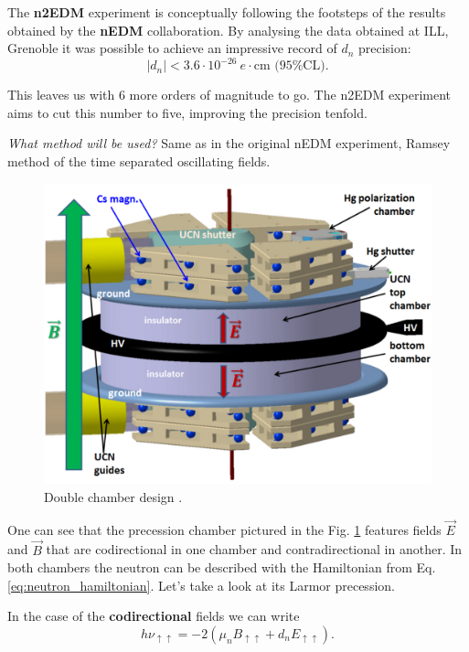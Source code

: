 The \textbf{n2EDM} experiment is conceptually following the footsteps of the results obtained by the \textbf{nEDM} collaboration. By analysing the data obtained at ILL, Grenoble it was possible to achieve \cite{Pendlebury2015} an impressive record of $d_n$ precision:
\begin{equation}
	\left| d_n \right| < 3.6 \cdot 10^{-26}\ e \cdot \text{cm (95\% CL)}.
\end{equation}

This leaves us with 6 more orders of magnitude to go. The n2EDM experiment aims to cut this number to five, improving \cite{Abel2018} the precision tenfold.

\textit{What method will be used?} Same as in the original nEDM experiment, Ramsey method of the time separated oscillating fields.

\begin{figure}[h]
	\includegraphics[width=\textwidth]{img/n2edm_chamber}
	\caption{Double chamber design \cite{Abel2018}.}
	\label{fig:precession_chamber}
\end{figure}

One can see that the precession chamber pictured in the Fig. \ref{fig:precession_chamber} features fields $\vec{E}$ and $\vec{B}$ that are codirectional in one chamber and contradirectional in another. In both chambers the neutron can be described with the Hamiltonian from Eq. \ref{eq:neutron_hamiltonian}. Let's take a look at its Larmor precession.

In the case of the \textbf{codirectional} fields we can write
\begin{equation}
	h\nu_{\uparrow \uparrow} = -2 \left( \mu_n B_{\uparrow \uparrow} + d_n E_{\uparrow \uparrow} \right).
	\label{eq:larmor_codirectional}
\end{equation}

